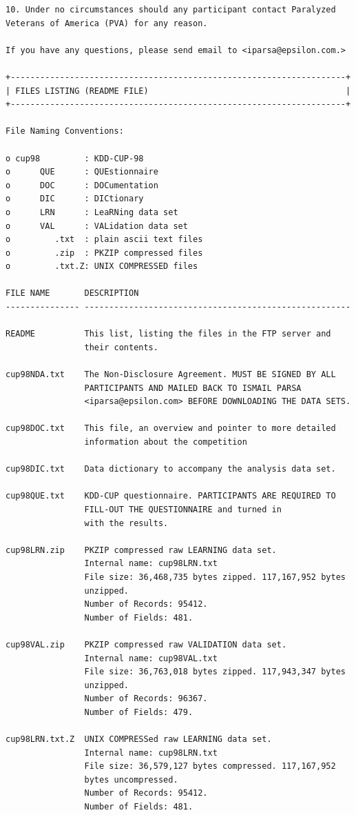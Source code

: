 \documentclass[
  11pt,
  a4paper,
  DIV=12,captions=tableheading,oneside,titlepage]{scrbook}
\begin{document}
\begin{verbatim}
10. Under no circumstances should any participant contact Paralyzed
Veterans of America (PVA) for any reason.

If you have any questions, please send email to <iparsa@epsilon.com.>

+--------------------------------------------------------------------+
| FILES LISTING (README FILE)                                        |
+--------------------------------------------------------------------+

File Naming Conventions: 

o cup98         : KDD-CUP-98 
o      QUE      : QUEstionnaire 
o      DOC      : DOCumentation
o      DIC      : DICtionary
o      LRN      : LeaRNing data set 
o      VAL      : VALidation data set 
o         .txt  : plain ascii text files
o         .zip  : PKZIP compressed files
o         .txt.Z: UNIX COMPRESSED files

FILE NAME       DESCRIPTION
--------------- ------------------------------------------------------

README          This list, listing the files in the FTP server and 
                their contents.

cup98NDA.txt    The Non-Disclosure Agreement. MUST BE SIGNED BY ALL 
                PARTICIPANTS AND MAILED BACK TO ISMAIL PARSA 
                <iparsa@epsilon.com> BEFORE DOWNLOADING THE DATA SETS.

cup98DOC.txt    This file, an overview and pointer to more detailed 
                information about the competition

cup98DIC.txt    Data dictionary to accompany the analysis data set. 

cup98QUE.txt    KDD-CUP questionnaire. PARTICIPANTS ARE REQUIRED TO
                FILL-OUT THE QUESTIONNAIRE and turned in
                with the results. 

cup98LRN.zip    PKZIP compressed raw LEARNING data set. 
                Internal name: cup98LRN.txt 
                File size: 36,468,735 bytes zipped. 117,167,952 bytes 
                unzipped.
                Number of Records: 95412.
                Number of Fields: 481.

cup98VAL.zip    PKZIP compressed raw VALIDATION data set. 
                Internal name: cup98VAL.txt 
                File size: 36,763,018 bytes zipped. 117,943,347 bytes 
                unzipped.
                Number of Records: 96367.
                Number of Fields: 479.
 
cup98LRN.txt.Z  UNIX COMPRESSed raw LEARNING data set. 
                Internal name: cup98LRN.txt 
                File size: 36,579,127 bytes compressed. 117,167,952 
                bytes uncompressed.
                Number of Records: 95412.
                Number of Fields: 481.


\end{verbatim}
\end{document}
